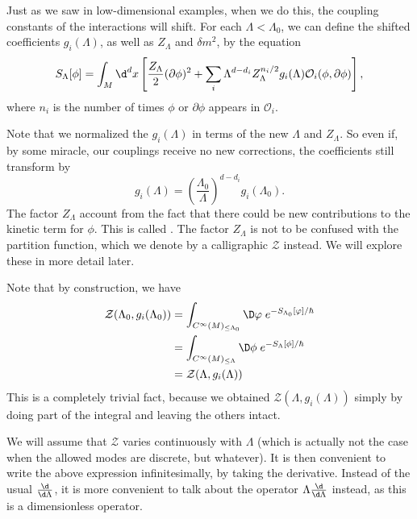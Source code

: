 \documentclass[a4paper]{article}
\begin{document}
Just as we saw in low-dimensional examples, when we do this, the coupling constants of the interactions will shift. For each $\Lambda < \Lambda_0$, we can define the shifted coefficients $g_i(\Lambda)$, as well as $Z_\Lambda$ and $\delta m^2$, by the equation
\[
  S_\Lambda[\phi] = \int_M \d^d x \left[\frac{Z_\Lambda}{2} (\partial \phi)^2 + \sum_i \Lambda^{d - d_i} Z_\Lambda^{n_i/2}g_i(\Lambda) \mathcal{O}_i (\phi, \partial \phi)\right],
\]
where $n_i$ is the number of times $\phi$ or $\partial \phi$ appears in $\mathcal{O}_i$.

Note that we normalized the $g_i(\Lambda)$ in terms of the new $\Lambda$ and $Z_\Lambda$. So even if, by some miracle, our couplings receive no new corrections, the coefficients still transform by
\[
  g_i(\Lambda) = \left(\frac{\Lambda_0}{\Lambda}\right)^{d - d_i} g_i(\Lambda_0).
\]
The factor $Z_\Lambda$ account from the fact that there could be new contributions to the kinetic term for $\phi$. This  is called . The factor $Z_\Lambda$ is not to be confused with the partition function, which we denote by a calligraphic $\mathcal{Z}$ instead. We will explore these in more detail later.

Note that by construction, we have
\begin{align*}
  \mathcal{Z}(\Lambda_0, g_i(\Lambda_0)) &= \int_{C^\infty(M)_{\leq \Lambda_0}} \D \varphi\;e^{-S_{\Lambda_0}[\varphi]/\hbar} \\
  &= \int_{C^\infty(M)_{\leq \Lambda}}\D \phi\; e^{-S_\Lambda[\phi]/\hbar} \\
  &= \mathcal{Z}(\Lambda, g_i(\Lambda))
\end{align*}
This is a completely trivial fact, because we obtained $\mathcal{Z}(\Lambda, g_i(\Lambda))$ simply by doing part of the integral and leaving the others intact.

We will assume that $\mathcal{Z}$ varies continuously with $\Lambda$ (which is actually not the case when the allowed modes are discrete, but whatever). It is then convenient to write the above expression infinitesimally, by taking the derivative. Instead of the usual $\frac{\d}{\d \Lambda}$, it is more convenient to talk about the operator $\Lambda \frac{\d}{\d \Lambda}$ instead, as this is a dimensionless operator.
\end{document}

